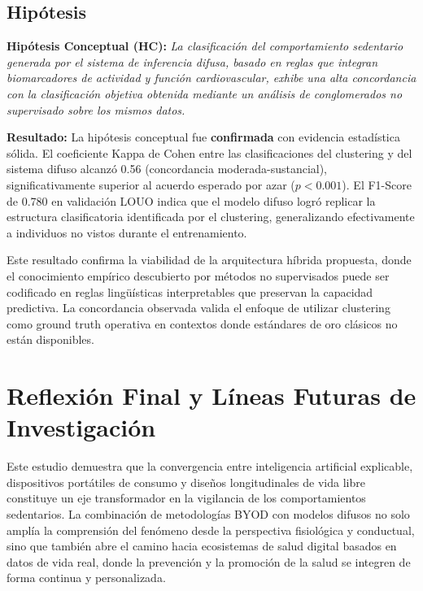 \subsection{Hipótesis}
\label{subsec:cumplimiento_hipotesis}

\textbf{Hipótesis Conceptual (HC):} \textit{La clasificación del comportamiento sedentario generada por el sistema de inferencia difusa, basado en reglas que integran biomarcadores de actividad y función cardiovascular, exhibe una alta concordancia con la clasificación objetiva obtenida mediante un análisis de conglomerados no supervisado sobre los mismos datos.}

\textbf{Resultado:} La hipótesis conceptual fue \textbf{confirmada} con evidencia estadística sólida. El coeficiente Kappa de Cohen entre las clasificaciones del clustering y del sistema difuso alcanzó 0.56 (concordancia moderada-sustancial), significativamente superior al acuerdo esperado por azar ($p < 0.001$). El F1-Score de 0.780 en validación LOUO indica que el modelo difuso logró replicar la estructura clasificatoria identificada por el clustering, generalizando efectivamente a individuos no vistos durante el entrenamiento.

Este resultado confirma la viabilidad de la arquitectura híbrida propuesta, donde el conocimiento empírico descubierto por métodos no supervisados puede ser codificado en reglas lingüísticas interpretables que preservan la capacidad predictiva. La concordancia observada valida el enfoque de utilizar clustering como ground truth operativa en contextos donde estándares de oro clásicos no están disponibles.


\section{Reflexión Final y Líneas Futuras de Investigación}
\label{sec:reflexion_final}

Este estudio demuestra que la convergencia entre inteligencia artificial explicable, dispositivos portátiles de consumo y diseños longitudinales de vida libre constituye un eje transformador en la vigilancia de los comportamientos sedentarios. La combinación de metodologías BYOD con modelos difusos no solo amplía la comprensión del fenómeno desde la perspectiva fisiológica y conductual, sino que también abre el camino hacia ecosistemas de salud digital basados en datos de vida real, donde la prevención y la promoción de la salud se integren de forma continua y personalizada.


